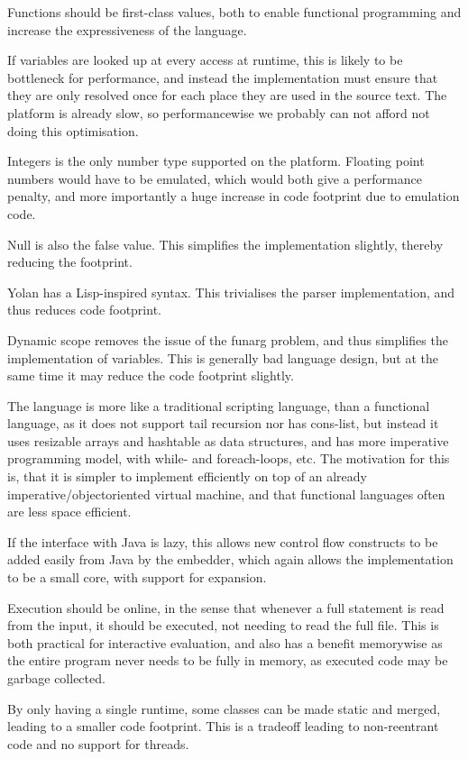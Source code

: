 \documentclass[11pt]{report}
\begin{document}
Functions should be first-class values, both to enable functional programming and increase the expressiveness of the language.

If variables are looked up at every access at runtime, this is likely to be bottleneck for performance, and instead the implementation must ensure that they are only resolved once for each place they are used in the source text.
The platform is already slow, so performancewise we probably can not afford not doing this optimisation.

Integers is the only number type supported on the platform. Floating point numbers would have to be emulated, which would both give a performance penalty, and more importantly a huge increase in code footprint due to emulation code.

Null is also the false value. This simplifies the implementation slightly, thereby reducing the footprint.

Yolan has a Lisp-inspired syntax. This trivialises the parser implementation, and thus reduces code footprint.

Dynamic scope removes the issue of the funarg problem, and thus simplifies the implementation of variables. This is generally bad language design, but at the same time it may reduce the code footprint slightly.

The language is more like a traditional scripting language, than a functional language, 
as it does not support tail recursion nor has cons-list, but instead it uses resizable arrays and hashtable as data structures, and has more imperative programming model, with while- and foreach-loops, etc.
The motivation for this is, that it is simpler to implement efficiently on top of an already imperative/objectoriented virtual machine, and that functional languages often are less space efficient.

If the interface with Java is lazy, this allows new control flow constructs to be added easily from Java by the embedder, which again allows the implementation to be a small core, with support for expansion.

Execution should be online, in the sense that whenever a full statement is read from the input, it should be executed, not needing to read the full file. This is both practical for interactive evaluation, and also has a benefit memorywise as the entire program never needs to be fully in memory, as executed code may be garbage collected.

By only having a single runtime, some classes can be made static and merged, leading to a smaller code footprint. This is a tradeoff leading to non-reentrant code and no support for threads.
\end{document}
